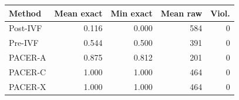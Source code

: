 \begin{tabular}{lrrrr}
\toprule
Method & Mean exact & Min exact & Mean raw & Viol.\\
\midrule
Post-IVF & 0.116 & 0.000 & 584 & 0\\
Pre-IVF & 0.544 & 0.500 & 391 & 0\\
PACER-A & 0.875 & 0.812 & 201 & 0\\
PACER-C & 1.000 & 1.000 & 464 & 0\\
PACER-X & 1.000 & 1.000 & 464 & 0\\
\bottomrule
\end{tabular}